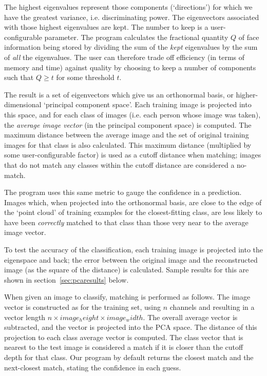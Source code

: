 The highest eigenvalues represent those components (`directions') for which we have the greatest variance, i.e. discriminating power. The eigenvectors associated with those highest eigenvalues are kept. The number to keep is a user-configurable parameter. The program calculates the fractional quantity $Q$ of face information being stored by dividing the sum of the \emph{kept} eigenvalues by the sum of \emph{all} the eigenvalues. The user can therefore trade off efficiency (in terms of memory and time) against quality by choosing to keep a number of components such that $Q \geq t$ for some threshold $t$.

The result is a set of eigenvectors which give us an orthonormal basis, or higher-dimensional `principal component space'. Each training image is projected into this space, and for each class of images (i.e. each person whose image was taken), the \emph{average image vector} (in the principal component space) is computed. The maximum distance between
the average image and the set of original training images for that class is also calculated. This maximum distance
(multiplied by some user-configurable factor) is used as a cutoff distance when
matching; images that do not match any classes within the cutoff distance are
considered a no-match.

The program uses this same metric to gauge the confidence in a prediction. Images which, when projected into the orthonormal basis, are close to the edge of the `point cloud' of training examples for the closest-fitting class, are less likely to have been \emph{correctly} matched to that class than those very near to the average image vector.

To test the accuracy of the classification, each training image is projected
into the eigenspace and back; the error between the original image and the
reconstructed image (as the square of the distance) is calculated. Sample results for
this are shown in section~\ref{sec:pcaresults} below.

When given an image to classify, matching is performed as follows. The image vector is constructed as for the training set, using $n$ channels and resulting in a vector length $n \times image_height \times image_width$. The overall average vector is subtracted, and the vector is projected into the PCA space. The distance of this projection to each class average vector is computed. The class vector that is nearest to the test image is considered a match if it is closer than the cutoff depth for that class. Our program by default returns the closest match and the next-closest match, stating the confidence in each guess.

